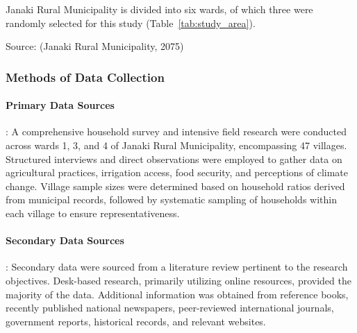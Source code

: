 Janaki Rural Municipality is divided into six wards, of which three were randomly selected for this study (Table~\ref{tab:study_area}). 

\begin{table}[ht]
\centering
\caption{Study Area with elevation and coordinates}
\label{tab:study_area}
\end{table}

Source: (Janaki Rural Municipality, 2075)

\subsubsection{Methods of Data Collection}
\paragraph{Primary Data Sources}:
A comprehensive household survey and intensive field research were conducted across wards 1, 3, and 4 of Janaki Rural Municipality, encompassing 47 villages. Structured interviews and direct observations were employed to gather data on agricultural practices, irrigation access, food security, and perceptions of climate change. Village sample sizes were determined based on household ratios derived from municipal records, followed by systematic sampling of households within each village to ensure representativeness.
\paragraph{Secondary Data Sources}:
Secondary data were sourced from a literature review pertinent to the research objectives. Desk-based research, primarily utilizing online resources, provided the majority of the data. Additional information was obtained from reference books, recently published national newspapers, peer-reviewed international journals, government reports, historical records, and relevant websites.
